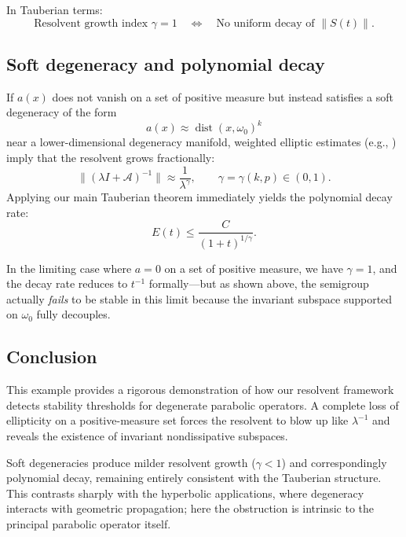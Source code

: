 \documentclass[11pt,reqno]{amsart}
\theoremstyle{remark}
\begin{document}
In Tauberian terms:
\[
\text{Resolvent growth index } \gamma = 1
\quad\Longleftrightarrow\quad
\text{No uniform decay of } \|S(t)\|.
\]

\subsection{Soft degeneracy and polynomial decay}

If $a(x)$ does not vanish on a set of positive measure but instead satisfies a soft degeneracy of the form
\[
a(x)\approx \operatorname{dist}(x,\omega_0)^k
\]
near a lower-dimensional degeneracy manifold, weighted elliptic estimates
(e.g., \cite{Examples2022}) imply that the resolvent grows fractionally:
\[
\|(\lambda I+\mathcal{A})^{-1}\|
   \approx \frac{1}{\lambda^\gamma},
\qquad \gamma=\gamma(k,p)\in(0,1).
\]
Applying our main Tauberian theorem immediately yields the polynomial decay rate:
\[
E(t)\le \frac{C}{(1+t)^{1/\gamma}}.
\]

In the limiting case where $a=0$ on a set of positive measure, we have $\gamma=1$,
and the decay rate reduces to $t^{-1}$ formally---but as shown above,
the semigroup actually \emph{fails} to be stable in this limit because the invariant subspace supported on $\omega_0$ fully decouples.

\subsection{Conclusion}

This example provides a rigorous demonstration of how our resolvent framework
detects stability thresholds for degenerate parabolic operators.
A complete loss of ellipticity on a positive-measure set forces the resolvent
to blow up like $\lambda^{-1}$ and reveals the existence of invariant
nondissipative subspaces.

Soft degeneracies produce milder resolvent growth ($\gamma < 1$) and correspondingly
polynomial decay, remaining entirely consistent with the Tauberian structure.
This contrasts sharply with the hyperbolic applications,
where degeneracy interacts with geometric propagation;
here the obstruction is intrinsic to the principal parabolic operator itself.
\end{document}
